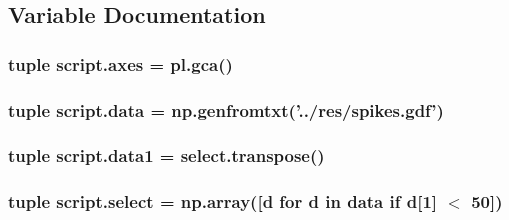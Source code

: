 \subsection{Variable Documentation}
\hypertarget{namespacescript_a14f6cfd960d8e7b5e7518604e661c3f4}{
\subsubsection[{axes}]{\setlength{\rightskip}{0pt plus 5cm}tuple script.\-axes = pl.\-gca()}}\label{namespacescript_a14f6cfd960d8e7b5e7518604e661c3f4}
\hypertarget{namespacescript_a90bc184d1f00ebc30a749662dc49f24b}{
\subsubsection[{data}]{\setlength{\rightskip}{0pt plus 5cm}tuple script.\-data = np.\-genfromtxt('../res/spikes.\-gdf')}}\label{namespacescript_a90bc184d1f00ebc30a749662dc49f24b}
\hypertarget{namespacescript_af71d9ea10b7c4687f80bf6bdaa9fdf06}{
\subsubsection[{data1}]{\setlength{\rightskip}{0pt plus 5cm}tuple script.\-data1 = select.\-transpose()}}\label{namespacescript_af71d9ea10b7c4687f80bf6bdaa9fdf06}
\hypertarget{namespacescript_aac11f1a96f0432e03e3d021dc4963841}{
\subsubsection[{select}]{\setlength{\rightskip}{0pt plus 5cm}tuple script.\-select = np.\-array(\mbox{[}d for d in {\bf data} if d\mbox{[}1\mbox{]} $<$ 50\mbox{]})}}\label{namespacescript_aac11f1a96f0432e03e3d021dc4963841}
